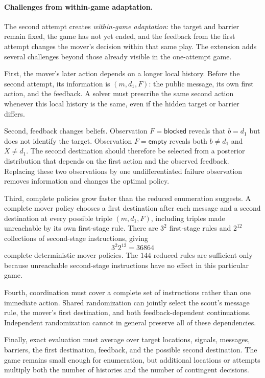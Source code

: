 \paragraph{Challenges from within-game adaptation.}
The second attempt creates \emph{within-game adaptation}: the target and barrier remain fixed, the game has not yet ended, and the feedback from the first attempt changes the mover's decision within that same play. The extension adds several challenges beyond those already visible in the one-attempt game.

First, the mover's later action depends on a longer local history. Before the second attempt, its information is $(m,d_1,F)$: the public message, its own first action, and the feedback. A solver must prescribe the same second action whenever this local history is the same, even if the hidden target or barrier differs.

Second, feedback changes beliefs. Observation $F=\mathsf{blocked}$ reveals that $b=d_1$ but does not identify the target. Observation $F=\mathsf{empty}$ reveals both $b\neq d_1$ and $X\neq d_1$. The second destination should therefore be selected from a posterior distribution that depends on the first action and the observed feedback. Replacing these two observations by one undifferentiated failure observation removes information and changes the optimal policy.

Third, complete policies grow faster than the reduced enumeration suggests. A complete mover policy chooses a first destination after each message and a second destination at every possible triple $(m,d_1,F)$, including triples made unreachable by its own first-stage rule. There are $3^2$ first-stage rules and $2^{12}$ collections of second-stage instructions, giving
\[
    3^2 2^{12}=36864
\]
complete deterministic mover policies. The $144$ reduced rules are sufficient only because unreachable second-stage instructions have no effect in this particular game.

Fourth, coordination must cover a complete set of instructions rather than one immediate action. Shared randomization can jointly select the scout's message rule, the mover's first destination, and both feedback-dependent continuations. Independent randomization cannot in general preserve all of these dependencies.

Finally, exact evaluation must average over target locations, signals, messages, barriers, the first destination, feedback, and the possible second destination. The game remains small enough for enumeration, but additional locations or attempts multiply both the number of histories and the number of contingent decisions.

